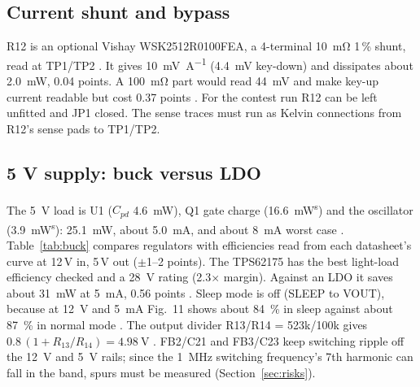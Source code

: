 \documentclass[11pt,letterpaper]{article}
\newcommand{\simv}{\textsuperscript{s}}
\begin{document}
\subsection{Current shunt and bypass}\label{sec:shunt}

R12 is an optional Vishay WSK2512R0100FEA, a 4-terminal \SI{10}{\milli\ohm} 1\,\% shunt, read at TP1/TP2 \cite{vishayWSK2512}. It gives \SI{10}{\milli\volt\per\ampere} (\SI{4.4}{\milli\volt} key-down) and dissipates about \SI{2.0}{\milli\watt}, 0.04 points. A \SI{100}{\milli\ohm} part would read \SI{44}{\milli\volt} and make key-up current readable but cost 0.37 points \cite{projnotes}. For the contest run R12 can be left unfitted and JP1 closed. The sense traces must run as Kelvin connections from R12's sense pads to TP1/TP2.

\subsection{5 V supply: buck versus LDO}\label{sec:buck}

The \SI{5}{\volt} load is U1 ($C_{pd}$ \SI{4.6}{\milli\watt}), Q1 gate charge (\SI{16.6}{\milli\watt}\simv) and the oscillator (\SI{3.9}{\milli\watt}\simv): \SI{25.1}{\milli\watt}, about \SI{5.0}{\milli\ampere}, and about \SI{8}{\milli\ampere} worst case \cite{projnotes}. Table~\ref{tab:buck} compares regulators with efficiencies read from each datasheet's curve at 12\,V in, 5\,V out ($\pm$1--2 points). The TPS62175 has the best light-load efficiency checked and a \SI{28}{\volt} rating (2.3$\times$ margin). Against an LDO it saves about \SI{31}{\milli\watt} at \SI{5}{\milli\ampere}, 0.56 points \cite{tiTPS62175,projnotes}. Sleep mode is off (SLEEP to VOUT), because at \SI{12}{\volt} and \SI{5}{\milli\ampere} Fig.~11 shows about \SI{84}{\percent} in sleep against about \SI{87}{\percent} in normal mode \cite{tiTPS62175}. The output divider R13/R14 = 523k/100k gives $0.8\,(1+R_{13}/R_{14})=\SI{4.98}{\volt}$ \cite[eq.~5]{tiTPS62175}. FB2/C21 and FB3/C23 keep switching ripple off the \SI{12}{\volt} and \SI{5}{\volt} rails; since the \SI{1}{\mega\hertz} switching frequency's 7th harmonic can fall in the band, spurs must be measured (Section~\ref{sec:risks}).
\end{document}
